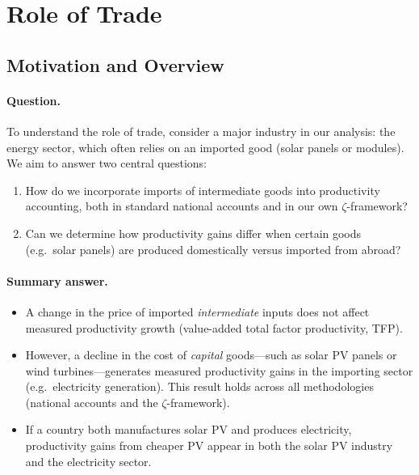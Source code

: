 \documentclass[11pt]{article}
\begin{document}
\section{Role of Trade}
\subsection{Motivation and Overview}

\paragraph{Question.} To understand the role of trade, consider a major industry in our analysis: 
the energy sector, which often relies on an imported good (solar panels or modules). 
We aim to answer two central questions:
\begin{enumerate}
    \item How do we incorporate imports of intermediate goods into productivity accounting, both 
    in standard national accounts and in our own $\zeta$-framework?
    \item Can we determine how productivity gains differ when certain goods (e.g.\ solar panels) are 
    produced domestically versus imported from abroad?
\end{enumerate}

\paragraph{Summary answer.} 
\begin{itemize}
    \item A change in the price of imported \emph{intermediate} inputs does not affect measured 
    productivity growth (value-added total factor productivity, TFP).
    \item However, a decline in the cost of \emph{capital} goods---such as solar PV panels or wind 
    turbines---generates measured productivity gains in the importing sector (e.g.\ electricity generation). 
    This result holds across all methodologies (national accounts and the $\zeta$-framework).
    \item If a country both manufactures solar PV and produces electricity, productivity gains from 
    cheaper PV appear in both the solar PV industry and the electricity sector.
\end{itemize}
\end{document}
